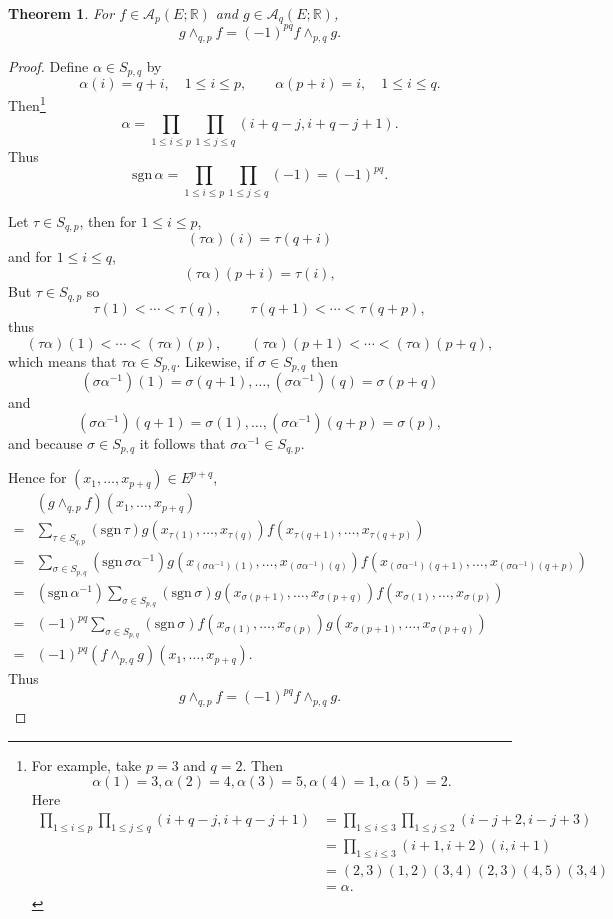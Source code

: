 \documentclass{amsart}
\newcommand{\sgn}{\mathrm{sgn}\,}
\newtheorem{theorem}{Theorem}
\theoremstyle{definition}
\begin{document}
\begin{theorem}
For $f \in \mathscr{A}_p(E;\mathbb{R})$ and  $g \in \mathscr{A}_q(E;\mathbb{R})$,
\[
g \wedge_{q,p} f = (-1)^{pq} f \wedge_{p,q} g.
\]
\label{swap}
\end{theorem}
\begin{proof}
Define $\alpha \in S_{p,q}$ by
\[
\alpha(i) = q+i,\quad 1 \leq i \leq p,\qquad \alpha(p+i) = i,\quad 1 \leq i \leq q.
\]
Then\footnote{For example, take $p=3$ and $q=2$. Then
\[
\alpha(1) = 3, \alpha(2) = 4, \alpha(3) = 5, \alpha(4) = 1, \alpha(5)=2.
\]
Here
\begin{align*}
\prod_{1 \leq i \leq p} \prod_{1 \leq j \leq q} (i+q-j,i+q-j+1)&=
\prod_{1 \leq i \leq 3} \prod_{1 \leq j \leq 2} (i-j+2,i-j+3)\\
&=\prod_{1 \leq i \leq 3} (i+1,i+2)(i,i+1)\\
&=(2,3)(1,2)(3,4)(2,3)(4,5)(3,4)\\
&=\alpha.
\end{align*}
}
\[
\alpha=\prod_{1 \leq i \leq p} \prod_{1 \leq j \leq q} (i+q-j,i+q-j+1).
\]
Thus
\[
\sgn \alpha = \prod_{1 \leq i \leq p} \prod_{1 \leq j \leq q} (-1)
=(-1)^{pq}.
\]


Let  $\tau \in S_{q,p}$, then 
for $1 \leq i \leq p$,
\[
(\tau \alpha)(i) = \tau(q+i)
\]
and
for $1 \leq i \leq q$,
\[
(\tau \alpha)(p+i) = \tau(i),
\]
But $\tau \in S_{q,p}$ so
\[
\tau(1)<\cdots<\tau(q),\qquad \tau(q+1)<\cdots<\tau(q+p),
\]
thus
\[
(\tau \alpha)(1)<\cdots<(\tau \alpha)(p),
\qquad (\tau \alpha)(p+1)<\cdots<(\tau\alpha)(p+q),
\]
which means that $\tau \alpha \in S_{p,q}$. 
Likewise, if $\sigma \in S_{p,q}$ then
\[
(\sigma \alpha^{-1})(1) = \sigma(q+1),
\ldots, (\sigma \alpha^{-1})(q) = \sigma(p+q)
\]
and
\[
(\sigma \alpha^{-1})(q+1)=\sigma(1),
\ldots, (\sigma \alpha^{-1})(q+p)=\sigma(p),
\]
and because $\sigma \in S_{p,q}$ it follows that
$\sigma \alpha^{-1} \in S_{q,p}$. 


Hence for
$(x_1,\ldots,x_{p+q}) \in E^{p+q}$,
\[
\begin{split}
&(g \wedge_{q,p} f)(x_1,\ldots,x_{p+q})\\
=&\sum_{\tau \in S_{q,p}} (\sgn \tau) g(x_{\tau(1)},\ldots,x_{\tau(q)}) f(x_{\tau(q+1)},\ldots,x_{\tau(q+p)})\\
=&\sum_{\sigma \in S_{p,q}} (\sgn \sigma \alpha^{-1}) g(x_{(\sigma \alpha^{-1})(1)},\ldots,
x_{(\sigma \alpha^{-1})(q)})
f(x_{(\sigma \alpha^{-1})(q+1)},\ldots,
x_{(\sigma \alpha^{-1})(q+p)})\\
=&(\sgn \alpha^{-1}) \sum_{\sigma \in S_{p,q}} (\sgn \sigma) g(x_{\sigma(p+1)},\ldots,x_{\sigma(p+q)})
f(x_{\sigma(1)},\ldots,x_{\sigma(p)})\\
=&(-1)^{pq} \sum_{\sigma \in S_{p,q}} (\sgn \sigma) f(x_{\sigma(1)},\ldots,x_{\sigma(p)}) g(x_{\sigma(p+1)},\ldots,x_{\sigma(p+q)})\\
=&(-1)^{pq} (f \wedge_{p,q} g)(x_1,\ldots,x_{p+q}).
\end{split}
\]
Thus
\[
g \wedge_{q,p} f = (-1)^{pq} f \wedge_{p,q} g. 
\]
\end{proof}
\end{document}

